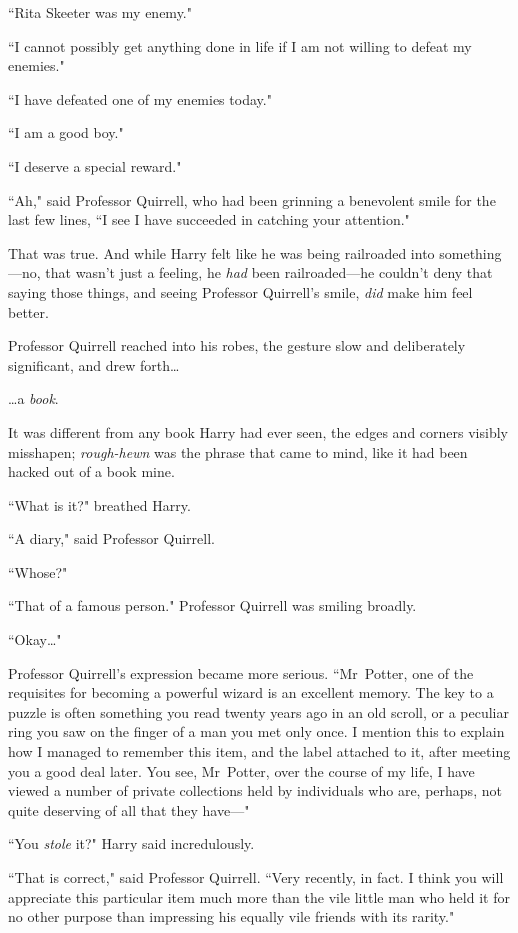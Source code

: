 ``Rita Skeeter was my enemy."

``I cannot possibly get anything done in life if I am not willing to defeat my enemies."

``I have defeated one of my enemies today."

``I am a good boy."

``I deserve a special reward."

``Ah," said Professor Quirrell, who had been grinning a benevolent smile for the last few lines, ``I see I have succeeded in catching your attention."

That was true. And while Harry felt like he was being railroaded into something—no, that wasn't just a feeling, he \emph{had} been railroaded—he couldn't deny that saying those things, and seeing Professor Quirrell's smile, \emph{did} make him feel better.

Professor Quirrell reached into his robes, the gesture slow and deliberately significant, and drew forth{\ldots}

{\ldots}a \emph{book}.

It was different from any book Harry had ever seen, the edges and corners visibly misshapen; \emph{rough-hewn} was the phrase that came to mind, like it had been hacked out of a book mine.

``What is it?" breathed Harry.

``A diary," said Professor Quirrell.

``Whose?"

``That of a famous person." Professor Quirrell was smiling broadly.

``Okay{\ldots}"

Professor Quirrell's expression became more serious. ``Mr~Potter, one of the requisites for becoming a powerful wizard is an excellent memory. The key to a puzzle is often something you read twenty years ago in an old scroll, or a peculiar ring you saw on the finger of a man you met only once. I mention this to explain how I managed to remember this item, and the label attached to it, after meeting you a good deal later. You see, Mr~Potter, over the course of my life, I have viewed a number of private collections held by individuals who are, perhaps, not quite deserving of all that they have—"

``You \emph{stole} it?" Harry said incredulously.

``That is correct," said Professor Quirrell. ``Very recently, in fact. I think you will appreciate this particular item much more than the vile little man who held it for no other purpose than impressing his equally vile friends with its rarity."

